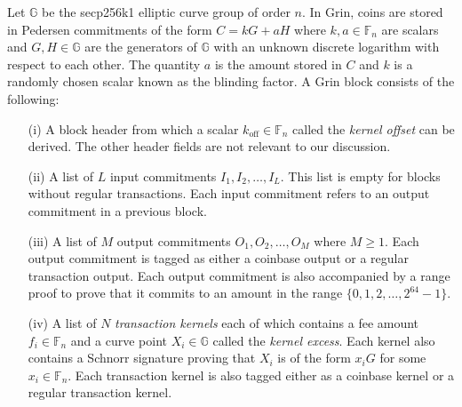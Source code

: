 Let $\mathbb{G}$ be the secp256k1 elliptic curve group of order $n$.
In Grin, coins are stored in Pedersen commitments of the form $C = kG + aH$ where $k, a \in \mathbb{F}_n$ are scalars and $G, H \in \mathbb{G}$ are the generators of $\mathbb{G}$ with an unknown discrete logarithm with respect to each other.
The quantity $a$ is the amount stored in $C$ and $k$ is a randomly chosen scalar known as the blinding factor. 
A Grin block consists of the following:
\begin{enumerate}
  \item[(i)] A block header from which a scalar $k_{\text{off}} \in \mathbb{F}_n$ called the \textit{kernel offset} can be derived. The other header fields are not relevant to our discussion.
  \item[(ii)] A list of $L$ input commitments $I_1, I_2,\ldots,I_L$. This list is empty for blocks without regular transactions. Each input commitment refers to an output commitment in a previous block.
  \item[(iii)] A list of $M$ output commitments $O_1, O_2,\ldots,O_M$ where $M \ge 1$. Each output commitment is tagged as either a coinbase output or a regular transaction output. Each output commitment is also accompanied by a range proof to prove that it commits to an amount in the range $\{0,1,2, \dots,2^{64}-1\}$.  
  \item[(iv)] A list of $N$ \textit{transaction kernels} each of which contains a fee amount $f_i \in \mathbb{F}_n$ and a curve point $X_i \in \mathbb{G}$ called the \textit{kernel excess}. Each kernel also contains a Schnorr signature proving that $X_i$ is of the form $x_iG$ for some $x_i \in \mathbb{F}_n$. Each transaction kernel is also tagged either as a coinbase kernel or a regular transaction kernel.
\end{enumerate}
